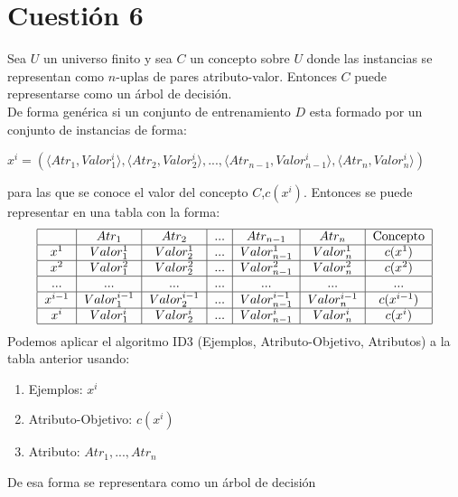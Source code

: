 \documentclass{article}
\begin{document}
\section*{Cuestión 6}
Sea $U$ un universo finito y sea $C$ un concepto sobre $U$ donde las instancias se representan como $n$-uplas de pares atributo-valor. Entonces $C$ puede representarse como un árbol de decisión.\\

De forma genérica si un conjunto de entrenamiento $D$ esta formado por un conjunto de instancias de forma:
\begin{center}
\(x^i=(\langle Atr_1,Valor_1^i\rangle,\langle Atr_2,Valor_2^i\rangle, ... ,\langle Atr_{n-1},Valor_{n-1}^i\rangle,\langle Atr_n,Valor_n^i\rangle)\)
\end{center}
para las que se conoce el valor del concepto $C$,$c(x^i)$. Entonces se puede representar en una tabla con la forma:\\
\begin{align*}
\begin{tabular}{|c|c|c|c|c|c|c|}
\hline
\textit{} & \textbf{$Atr_1$} & $Atr_2$  & ...  & $Atr_{n-1}$ & $Atr_{n}$ & Concepto   \\ \hline
$x^1$     & $Valor_1^1$     & $Valor_2^1$     & ... & $Valor_{n-1}^1$     & $Valor_{n}^1$     & $c(x^1)$\\ \hline
$x^2$     & $Valor_1^2$     & $Valor_2^2$     & ... & $Valor_{n-1}^2$     & $Valor_{n}^2$     & $c(x^2)$\\ \hline
...         & ...             & ...             & ... & ...                 & ...                & ...\\ \hline
$x^{i-1}$ & $Valor_1^{i-1}$ & $Valor_2^{i-1}$ & ... & $Valor_{n-1}^{i-1}$ & $Valor_{n}^{i-1}$ & $c(x^{i-1})$\\ \hline
$x^{i}$   & $Valor_1^{i}$   & $Valor_2^{i}$   & ... & $Valor_{n-1}^{i}$   & $Valor_{n}^{i}$   & $c(x^{i})$\\ \hline
\end{tabular}
\end{align*}
Podemos aplicar el algoritmo ID3 (Ejemplos, Atributo-Objetivo, Atributos) a la tabla anterior usando:
\begin{enumerate}
    \item Ejemplos: $x^i$
    \item Atributo-Objetivo: $c(x^{i})$
    \item  Atributo: $Atr_1, ..., Atr_n$
\end{enumerate}
De esa forma se representara como un árbol de decisión
\end{document}
